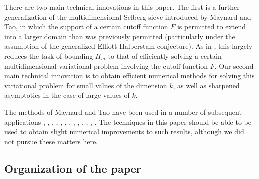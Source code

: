 \documentclass{bmcart}
\theoremstyle{plain}
\theoremstyle{definition}
\begin{document}
There are two main technical innovations in this paper.  The first is a further generalization of the multidimensional Selberg sieve introduced by Maynard and Tao, in which the support of a certain cutoff function $F$ is permitted to extend into a larger domain than was previously permitted (particularly under the assumption of the generalized Elliott-Halberstam conjecture).  As in \cite{maynard-new}, this largely reduces the task of bounding $H_m$ to that of efficiently solving a certain multidimensional variational problem involving the cutoff function $F$.  Our second main technical innovation is to obtain efficient numerical methods for solving this variational problem for small values of the dimension $k$, as well as sharpened asymptotics in the case of large values of $k$.

The methods of Maynard and Tao have been used in a number of subsequent applications \cite{freiberg}, \cite{consecutive}, \cite{thorner}, \cite{benatar}, \cite{li-pan}, \cite{castillo}, \cite{pollack}, \cite{banks}, \cite{clusters}, \cite{lola}, \cite{pintz-ratio}, \cite{chua}, \cite{pintz-new}.  The techniques in this paper should be able to be used to obtain slight numerical improvements to such results, although we did not pursue these matters here.

\subsection{Organization of the paper}
\end{document}
